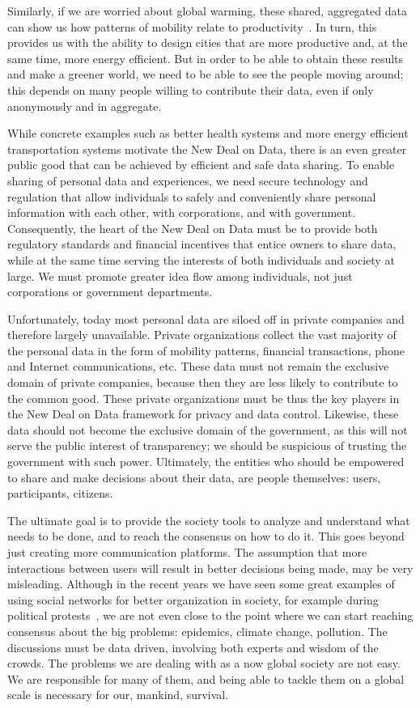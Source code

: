 Similarly, if we are worried about global warming, these shared, aggregated data can show us how patterns of mobility relate to productivity~\cite{pan2013urban}.
In turn, this provides us with the ability to design cities that are more productive and, at the same time, more energy efficient.
But in order to be able to obtain these results and make a greener world, we need to be able to see the people moving around; this depends on many people willing to contribute their data, even if only anonymously and in aggregate.

While concrete examples such as better health systems and more energy efficient transportation systems motivate the New Deal on Data, there is an even greater public good that can be achieved by efficient and safe data sharing.
To enable sharing of personal data and experiences, we need secure technology and regulation that allow individuals to safely and conveniently share personal information with each other, with corporations, and with government.
Consequently, the heart of the New Deal on Data must be to provide both regulatory standards and financial incentives that entice owners to share data, while at the same time serving the interests of both individuals and society at large.
We must promote greater idea flow among individuals, not just corporations or government departments.

Unfortunately, today most personal data are siloed off in private companies and therefore largely unavailable.
Private organizations collect the vast majority of the personal data in the form of mobility patterns, financial transactions, phone and Internet communications, etc.
These data must not remain the exclusive domain of private companies, because then they are less likely to contribute to the common good.
These private organizations must be thus the key players in the New Deal on Data framework for privacy and data control.
Likewise, these data should not become the exclusive domain of the government, as this will not serve the public interest of transparency; we should be suspicious of trusting the government with such power.
Ultimately, the entities who should be empowered to share and make decisions about their data, are people themselves: users, participants, citizens.

The ultimate goal is to provide the society tools to analyze and understand what needs to be done, and to reach the consensus on how to do it.
This goes beyond just creating more communication platforms.
The assumption that more interactions between users will result in better decisions being made, may be very misleading. 
Although in the recent years we have seen some great examples of using social networks for better organization in society, for example during political protests~\cite{grossman2009iran, barry2009protests}, we are not even close to the point where we can start reaching consensus about the big problems: epidemics, climate change, pollution.
The discussions must be data driven, involving both experts and wisdom of the crowds.
The problems we are dealing with as a now global society are not easy. 
We are responsible for many of them, and being able to tackle them on a global scale is necessary for our, mankind, survival.

